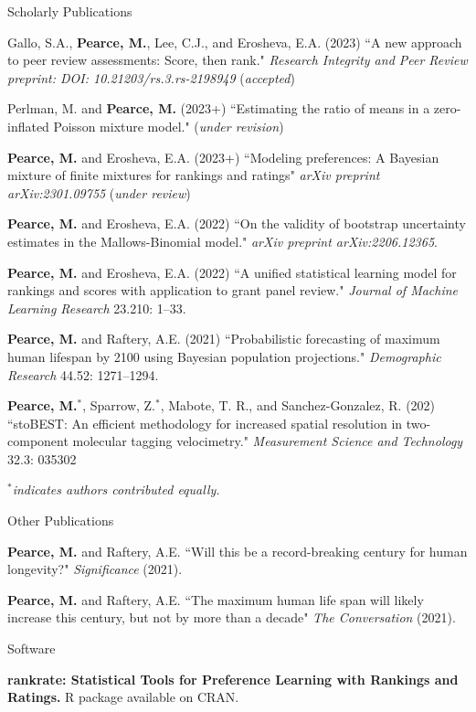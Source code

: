 \documentclass{resume} %
\begin{document}
\begin{rSection}{Scholarly Publications}

Gallo, S.A., {\bf Pearce, M.}, Lee, C.J., and Erosheva, E.A. (2023) ``A new approach to peer review assessments: Score, then rank." \textit{Research Integrity and Peer Review preprint: DOI: 10.21203/rs.3.rs-2198949} (\textit{accepted})

Perlman, M. and {\bf Pearce, M.} (2023+) ``Estimating the ratio of means in a zero-inflated Poisson mixture model." (\textit{under revision})

{\bf Pearce, M.} and Erosheva, E.A. (2023+) ``Modeling preferences: A Bayesian mixture of finite mixtures for rankings and ratings" \textit{arXiv preprint arXiv:2301.09755} (\textit{under review})

{\bf Pearce, M.} and Erosheva, E.A. (2022) ``On the validity of bootstrap uncertainty estimates in the Mallows-Binomial model." \textit{arXiv preprint arXiv:2206.12365}.

{\bf Pearce, M.} and Erosheva, E.A. (2022) ``A unified statistical learning model for rankings and scores with application to grant panel review." \textit{Journal of Machine Learning Research} 23.210: 1--33.

{\bf Pearce, M.} and Raftery, A.E. (2021) ``Probabilistic forecasting of maximum human lifespan by 2100 using Bayesian population projections." {\em Demographic Research} 44.52: 1271--1294.

{\bf Pearce, M.}$^*$, Sparrow, Z.$^*$, Mabote, T. R., and Sanchez-Gonzalez, R. (202) ``stoBEST: An efficient methodology for increased spatial resolution in two-component molecular tagging velocimetry." {\em Measurement Science and Technology} 32.3: 035302

{\em $^*$indicates authors contributed equally.}
\end{rSection}
\newpage

\begin{rSection}{Other Publications}

{\bf Pearce, M.} and Raftery, A.E. ``Will this be a record-breaking century for human longevity?" {\em Significance} (2021).

{\bf Pearce, M.} and Raftery, A.E. ``The maximum human life span will likely increase this century, but not by more than a decade" {\em The Conversation} (2021).

\end{rSection}

\begin{rSection}{Software}

{\bf rankrate: Statistical Tools for Preference Learning with Rankings and Ratings.} R package available on CRAN.

\end{rSection}
\end{document}
